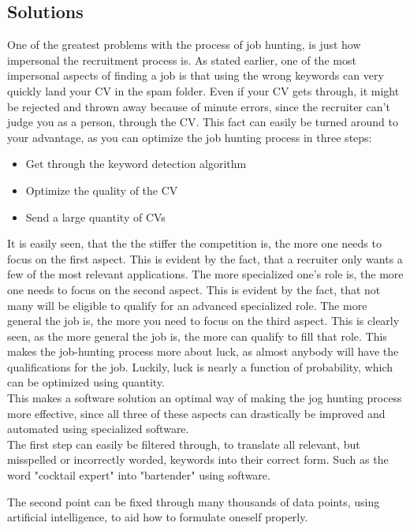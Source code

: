 \subsection{Solutions}
One of the greatest problems with the process of job hunting, is just how impersonal
the recruitment process is. As stated earlier, one of the most impersonal aspects
of finding a job is that using the wrong keywords can very
quickly land your CV in the spam folder.
Even if your CV gets through, it might be rejected and thrown away because of
minute errors, since the recruiter can't judge you as a person, through the CV.
This fact can easily be turned around to your advantage, as you can optimize the
job hunting process in three steps:   
\begin{itemize}
  \item Get through the keyword detection algorithm
  \item Optimize the quality of the CV
  \item Send a large quantity of CVs
\end{itemize}

It is easily seen, that the the stiffer the competition is, the more one 
needs to focus on the first aspect. This is evident by the fact, that a 
recruiter only wants a few of the most relevant applications.
The more specialized one's role is, the more one needs to focus on the second
aspect. This is evident by the fact, that not many will be eligible to qualify
for an advanced specialized role.
The more general the job is, the more you need to focus on the third
aspect. This is clearly seen, as the more general the job is, the more can 
qualify to fill that role. This makes the job-hunting process more about luck, 
as almost anybody will have the qualifications for the job.
Luckily, luck is nearly a function of probability, which can be optimized using
quantity. \\

This makes a software solution an optimal way of making the jog hunting process more effective,
since all three of these aspects can drastically be improved and automated
using specialized software. \\

The first step can easily be filtered through, to translate all relevant, but
misspelled or incorrectly worded, keywords into their correct form. Such
as the word "cocktail expert" into "bartender" using software.

The second point can be fixed through many thousands of data points, using
artificial intelligence, to aid how to formulate oneself properly. 

